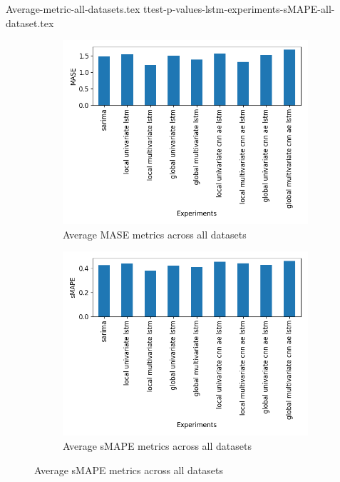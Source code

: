 {Average-metric-all-datasets.tex}
{ttest-p-values-lstm-experiments-sMAPE-all-dataset.tex}
\begin{figure}
  \caption{Barplot comparing average model perfomance across all datasets}
  \begin{subfigure}[b]{0.49\textwidth}
    \includegraphics[width=\textwidth]{./figs/results/barplot/MASE-all-dataset.png}
    \hfill
    \caption{Average MASE metrics across all datasets}
  \end{subfigure}
  \begin{subfigure}[b]{0.49\textwidth}
    \includegraphics[width=\textwidth]{./figs/results/barplot/sMAPE-all-dataset.png}
    \hfill
    \caption{Average sMAPE metrics across all datasets}

  \end{subfigure}
  \label{fig:results:barplot-average-all-datasets}
\end{figure}

